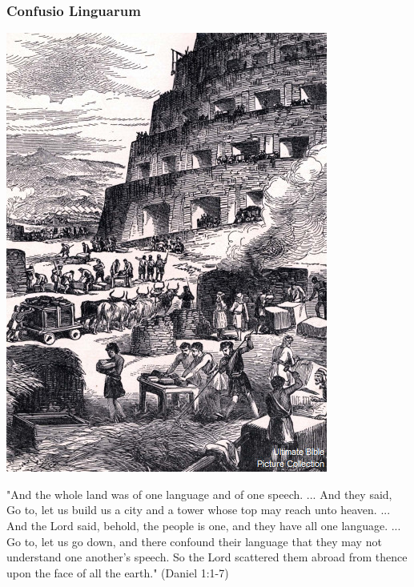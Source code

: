 \begin{frame}\frametitle{Confusio Linguarum}

  \begin{minipage}{0.45\textwidth}
    \includegraphics[width=\textwidth]{pic/Babel_1166-12.jpg}
  \end{minipage}\hfill
  \begin{minipage}{0.45\textwidth}
    "And   the  whole   land   was   of  one   language   and  of   one
    speech. ...  And they said, Go to, let us build  us a city and a
    tower whose top may  reach unto heaven. ...  And the Lord said,
    behold,   the   people   is   one,   and   they   have   all   one
    language. ... Go to, let  us go down, and  there confound their
    language that  they may not  understand one another’s  speech.  So
    the Lord  scattered them abroad from  thence upon the face  of all
    the earth." (Daniel 1:1-7)
  \end{minipage}

\end{frame}

